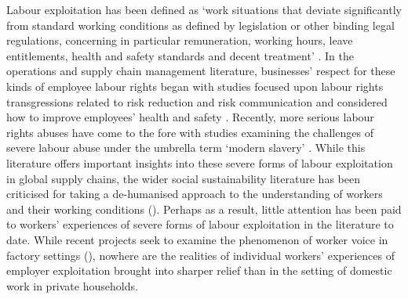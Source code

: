 \documentclass[
  12pt,
  letterpaper,
  DIV=11,
  numbers=noendperiod]{scrartcl}
\theoremstyle{plain}
\theoremstyle{definition}
\begin{document}
Labour exploitation has been defined as `work situations that deviate
significantly from standard working conditions as defined by legislation
or other binding legal regulations, concerning in particular
remuneration, working hours, leave entitlements, health and safety
standards and decent treatment'
\autocite[10]{european_union_for_fundamental_rights_severe_2015}. In the
operations and supply chain management literature, businesses' respect
for these kinds of employee labour rights began with studies focused
upon labour rights transgressions related to risk reduction and risk
communication and considered how to improve employees' health and safety
\autocite{chinander_aligning_2001,wolf_operationalizing_2001}. Recently,
more serious labour rights abuses have come to the fore with studies
examining the challenges of severe labour abuse under the umbrella term
`modern slavery'
\autocite{gold_modern_2015,new_modern_2015,benstead_horizontal_2018,stevenson_modern_2018}.
While this literature offers important insights into these severe forms
of labour exploitation in global supply chains, the wider social
sustainability literature has been criticised for taking a de-humanised
approach to the understanding of workers and their working conditions
(\textcite{soundararajan_humanizing_2021}). Perhaps as a result, little
attention has been paid to workers' experiences of severe forms of
labour exploitation in the literature to date. While recent projects
seek to examine the phenomenon of worker voice in factory settings
(\textcite{leverhulme_trust_research_2022}), nowhere are the realities
of individual workers' experiences of employer exploitation brought into
sharper relief than in the setting of domestic work in private
households.
\end{document}
